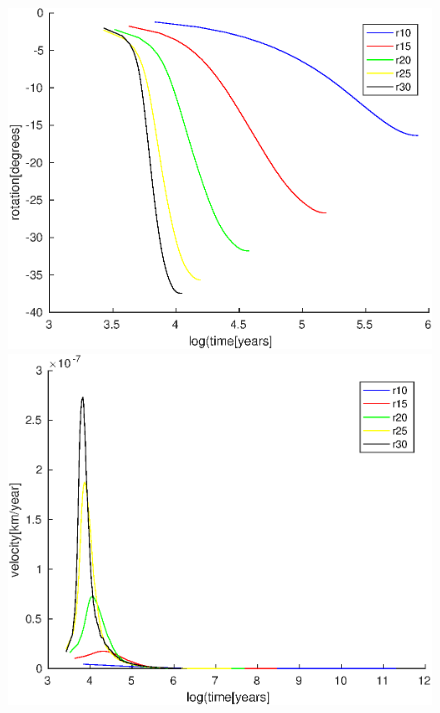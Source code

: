 \documentclass[12pt]{scrreprt}
\begin{document}
\begin{figure}[ht!]
	\begin{minipage}[t]{1.0\textwidth}
		\begin{minipage}[t]{0.5\textwidth}
		\includegraphics[width=1.0\textwidth]{./Snapshots/slab60s1e8mixedr_rot.eps}
		\end{minipage}
		\begin{minipage}[t]{0.5\textwidth}
		\includegraphics[width=1.0\textwidth]{./Snapshots/slab60s1e8mixedr_vel.eps}
		\end{minipage}
	\end{minipage}

\end{figure}
\end{document}
